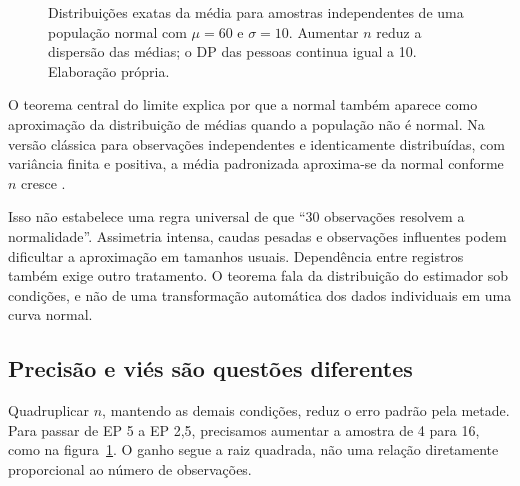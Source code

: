 \begin{figure}[H]
\centering
{}
\caption{Distribuições exatas da média para amostras independentes de uma população normal com $\mu=60$ e $\sigma=10$. Aumentar $n$ reduz a dispersão das médias; o DP das pessoas continua igual a 10. Elaboração própria.}
\label{fig:medias-amostrais}
\end{figure}

O teorema central do limite explica por que a normal também aparece como aproximação da distribuição de médias quando a população não é normal. Na versão clássica para observações independentes e identicamente distribuídas, com variância finita e positiva, a média padronizada aproxima-se da normal conforme $n$ cresce \parencite{NISTNormal}.

Isso não estabelece uma regra universal de que ``30 observações resolvem a normalidade''. Assimetria intensa, caudas pesadas e observações influentes podem dificultar a aproximação em tamanhos usuais. Dependência entre registros também exige outro tratamento. O teorema fala da distribuição do estimador sob condições, e não de uma transformação automática dos dados individuais em uma curva normal.

\subsection{Precisão e viés são questões diferentes}

Quadruplicar $n$, mantendo as demais condições, reduz o erro padrão pela metade. Para passar de EP 5 a EP 2,5, precisamos aumentar a amostra de 4 para 16, como na figura~\ref{fig:medias-amostrais}. O ganho segue a raiz quadrada, não uma relação diretamente proporcional ao número de observações.

